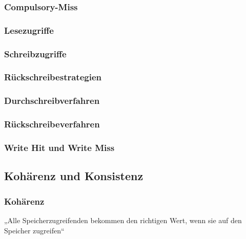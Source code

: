 \subsubsection*{Compulsory-Miss}

\subsubsection{Lesezugriffe}

\subsubsection{Schreibzugriffe}
\subsubsection*{Rückschreibestrategien}
\subsubsection*{Durchschreibverfahren}
\subsubsection*{Rückschreibeverfahren}
\subsubsection*{Write Hit und Write Miss}

\subsection{Kohärenz und Konsistenz}
\subsubsection{Kohärenz}
„Alle Speicherzugreifenden bekommen den richtigen Wert, wenn sie auf den Speicher zugreifen“

